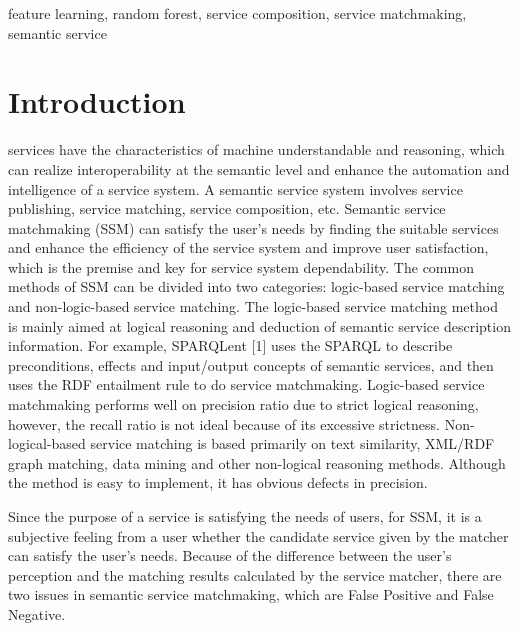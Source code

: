 \documentclass{ieeeaccess}
\begin{document}
\begin{keywords}
feature learning, random forest, service composition, service matchmaking, semantic service
\end{keywords}

\titlepgskip=-15pt

\maketitle

\section{Introduction}
\label{sec:introduction}

 services have the characteristics of machine understandable and reasoning, which can realize interoperability at the semantic level and enhance the automation and intelligence of a service system. A semantic service system involves service publishing, service matching, service composition, etc. Semantic service matchmaking (SSM) can satisfy the user's needs by finding the suitable services and enhance the efficiency of the service system and improve user satisfaction, which is the premise and key for service system dependability. The common methods of SSM can be divided into two categories: logic-based service matching and non-logic-based service matching. The logic-based service matching method is mainly aimed at logical reasoning and deduction of semantic service description information. For example, SPARQLent [1] uses the SPARQL to describe preconditions, effects and input/output concepts of semantic services, and then uses the RDF entailment rule to do service matchmaking. Logic-based service matchmaking performs well on precision ratio due to strict logical reasoning, however, the recall ratio is not ideal because of its excessive strictness. Non-logical-based service matching is based primarily on text similarity, XML/RDF graph matching, data mining and other non-logical reasoning methods. Although the method is easy to implement, it has obvious defects in precision.

Since the purpose of a service is satisfying the needs of users, for SSM, it is a subjective feeling from a user whether the candidate service given by the matcher can satisfy the user's needs. Because of the difference between the user's perception and the matching results calculated by the service matcher, there are two issues in semantic service matchmaking, which are False Positive and False Negative.
\end{document}
